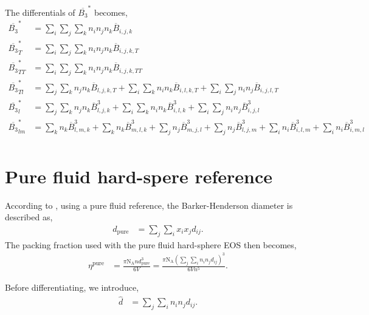 \documentclass[english]{../thermomemo/thermomemo}
\newcommand*{\lb}{\left(}
\newcommand*{\rb}{\right)}
\newcommand{\pure}{\ensuremath{\text{pure}}\xspace}
\newcommand{\NA}{\ensuremath{\text{N}_{\text{A}}}\xspace}
\begin{document}
The differentials of $\overline{B_3}^*$ becomes,
\begin{align}
  \label{eq:B3_diff}
  \overline{B_3}^* &= \sum_i \sum_j \sum_k n_{i} n_{j} n_{k} \overline{B}_{i,j,k}\\
  \overline{B_3}^*_T &= \sum_i \sum_j \sum_k n_{i} n_{j} n_{k} \overline{B}_{i,j,k,T}\\
  \overline{B_3}^*_{TT} &= \sum_i \sum_j \sum_k n_{i} n_{j} n_{k} \overline{B}_{i,j,k,TT}\\
  \overline{B_3}^*_{Tl} &= \sum_j \sum_k n_{j} n_{k} \overline{B}_{l,j,k,T} + \sum_i \sum_k n_{i} n_{k} \overline{B}_{i,l,k,T} + \sum_i \sum_j n_{i} n_{j} \overline{B}_{i,j,l,T}\\
  \overline{B_3}^*_{l} &= \sum_j \sum_k n_{j} n_{k} \overline{B}_{l,j,k}^3 + \sum_i \sum_k n_{i} n_{k} \overline{B}_{i,l,k}^3 + \sum_i \sum_j n_{i} n_{j} \overline{B}_{i,j,l}^3\\
  \overline{B_3}^*_{lm} &= \sum_k n_{k} \overline{B}_{l,m,k}^3 + \sum_k n_{k} \overline{B}_{m,l,k}^3 + \sum_j n_{j} \overline{B}_{m,j,l}^3 + \sum_j n_{j} \overline{B}_{l,j,m}^3 + \sum_i n_{i} \overline{B}_{i,l,m}^3 + \sum_i n_{i} \overline{B}_{i,m,l}^3\\
\end{align}

\section{Pure fluid hard-spere reference}
According to \citet{Leonard1970}, using a pure fluid reference, the Barker-Henderson diameter is described as,
\begin{align}
  \label{eq:d_BH_pure}
  d_{\pure} &= \sum_j \sum_i x_i x_j d_{ij}.
\end{align}
The packing fraction used with the pure fluid hard-sphere EOS then becomes,
\begin{align}
  \label{eq:eta_BH_pure}
  \eta^{\pure} &= \frac{ \pi \NA n d_{\pure}^3}{6 V} = \frac{ \pi \NA \lb \sum_j \sum_i n_i n_j d_{ij} \rb^3}{6 V n^5}.
\end{align}

Before differentiating, we introduce,
\begin{align}
  \label{eq:d_BH_hat}
  \hat{d} &=  \sum_j \sum_i n_i n_j d_{ij}.
\end{align}
\end{document}
